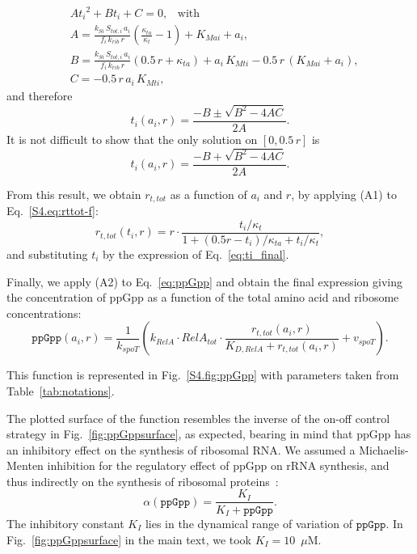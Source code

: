 \documentclass[a4paper,12pt]{article}
\newcommand{\tr}[1]{{#1}}
\begin{document}
\begin{equation}
\begin{alignedat}{2}
&A {t_i}^2 + B t_i + C = 0, \;\;\; \text{with}\\
&A = \frac{k_{Si} \,S_{tot,i} \,a_i}{f_i\, k_{rib} \,r} \left( \frac{\kappa_{ta}}{\kappa_t} - 1\right) + K_{Mai} + a_i,\\
&B = \frac{k_{Si} \,S_{tot,i} \,a_i}{f_i \,k_{rib} \,r} (0.5\,r+\kappa_{ta}) + a_i \,K_{Mti} - 0.5\,r\,(K_{Mai} + a_i),\\
&C = - 0.5 \,r \,a_i \,K_{Mti},
\end{alignedat}
\end{equation}
and therefore
\[
t_i (a_i, r) = \frac{-B \pm \sqrt{B^2 - 4AC}}{2A}.
\]
It is not difficult to show that the only solution on $[0, 0.5\,r]$ is
\begin{equation}
\label{eq:ti_final}
t_i (a_i, r) = \frac{-B + \sqrt{B^2 - 4AC}}{2A}.
\end{equation}
\tr{
From this result, we obtain $r_{t,tot}$ as a function of $a_i$ and $r$, by applying (A1) to Eq.~\ref{S4.eq:rttot-f}:
\begin{equation}
\label{eq:rttot-f_without_sum}
r_{t,tot}(t_i, r) = r \cdot \frac{t_i/\kappa_{t}}{1+(0.5 r-t_i)/\kappa_{ta}+t_i/\kappa_{t}},
\end{equation}
and substituting $t_i$ by the expression of Eq.~\ref{eq:ti_final}.

Finally, we apply (A2) to Eq.~\ref{eq:ppGpp} and obtain the final expression giving the concentration of ppGpp as a function of the total amino acid and ribosome concentrations:
\begin{equation}
\texttt{ppGpp}(a_i, r) = \frac{1}{k_{spoT}} \left( k_{RelA} \cdot RelA_{tot} \cdot \frac{r_{t,tot}(a_i, r)}{K_{D,RelA} + r_{t,tot}(a_i,r)} + v_{spoT} \right).
\end{equation}
}
This function is represented in Fig.~\ref{S4.fig:ppGpp} with parameters taken from Table~\ref{tab:notations}.

The plotted surface of the function resembles the inverse of the on-off control strategy in Fig.~\ref{fig:ppGppsurface}, as expected, bearing in mind that ppGpp has an inhibitory effect on the synthesis of ribosomal RNA.
We assumed a Michaelis-Menten inhibition for the regulatory effect of ppGpp on rRNA synthesis, and thus indirectly on the synthesis of ribosomal proteins~\cite{potrykus_pppgpp_2008,keener_regulation_1996}:
\begin{equation}
\alpha (\texttt{ppGpp}) = \frac{K_I}{K_I + \texttt{ppGpp}}.
\end{equation}
The inhibitory constant $K_I$ lies in the dynamical range of variation of $\texttt{ppGpp}$.
In Fig.~\ref{fig:ppGppsurface} in the main text, we took $K_I = 10$~$\mu$M.
\end{document}
